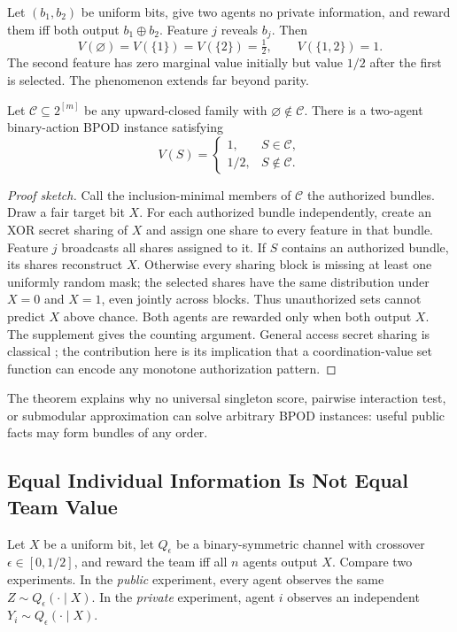 Let $(b_1,b_2)$ be uniform bits, give two agents no private information, and reward them iff both output $b_1\oplus b_2$. Feature $j$ reveals $b_j$. Then
\[
V(\varnothing)=V(\{1\})=V(\{2\})=\tfrac12,
\qquad V(\{1,2\})=1.
\]
The second feature has zero marginal value initially but value $1/2$ after the first is selected. The phenomenon extends far beyond parity.

\begin{theorem}\label{thm:access}
Let $\mathcal C\subseteq2^{[m]}$ be any upward-closed family with $\varnothing\notin\mathcal C$. There is a two-agent binary-action BPOD instance satisfying
\[
V(S)=
\begin{cases}
1,&S\in\mathcal C,\\
1/2,&S\notin\mathcal C.
\end{cases}
\]
\end{theorem}

\begin{proof}[Proof sketch]
Call the inclusion-minimal members of $\mathcal C$ the authorized bundles. Draw a fair target bit $X$. For each authorized bundle independently, create an XOR secret sharing of $X$ and assign one share to every feature in that bundle. Feature $j$ broadcasts all shares assigned to it. If $S$ contains an authorized bundle, its shares reconstruct $X$. Otherwise every sharing block is missing at least one uniformly random mask; the selected shares have the same distribution under $X=0$ and $X=1$, even jointly across blocks. Thus unauthorized sets cannot predict $X$ above chance. Both agents are rewarded only when both output $X$. The supplement gives the counting argument. General access secret sharing is classical \cite{ItoEtAl1989,Beimel2011}; the contribution here is its implication that a coordination-value set function can encode any monotone authorization pattern.
\end{proof}

The theorem explains why no universal singleton score, pairwise interaction test, or submodular approximation can solve arbitrary BPOD instances: useful public facts may form bundles of any order.

\subsection{Equal Individual Information Is Not Equal Team Value}

Let $X$ be a uniform bit, let $Q_\epsilon$ be a binary-symmetric channel with crossover $\epsilon\in[0,1/2]$, and reward the team iff all $n$ agents output $X$. Compare two experiments. In the \emph{public} experiment, every agent observes the same $Z\sim Q_\epsilon(\cdot\mid X)$. In the \emph{private} experiment, agent $i$ observes an independent $Y_i\sim Q_\epsilon(\cdot\mid X)$.

